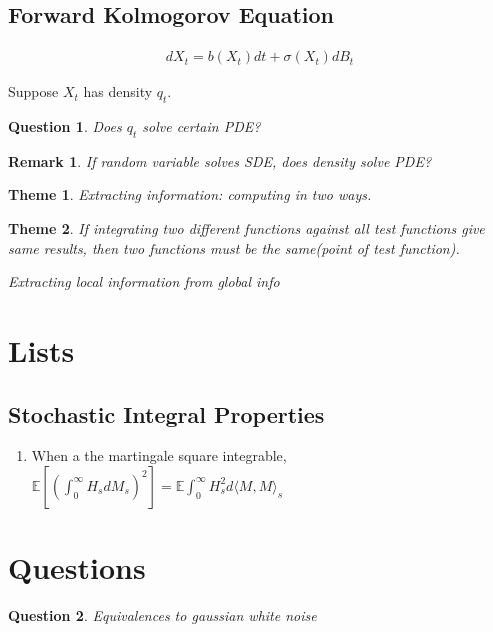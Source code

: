 \documentclass[11pt]{article}
\newcommand{\E}{\mathbb{E}}
\newtheorem{remark}{Remark}
\newtheorem{quest}{Question}
\newtheorem{theme}{Theme}
\begin{document}
\subsection{Forward Kolmogorov Equation}

\begin{align*}
	dX_t = b(X_t) dt + \sigma(X_t)dB_t
\end{align*}

Suppose $X_t$ has density $q_t$. 
\begin{quest}
	Does $q_t$ solve certain PDE?
\end{quest}

\begin{remark}
	If random variable solves SDE, does density solve PDE?
\end{remark}

\begin{theme}
	Extracting information: computing in two ways.
\end{theme}

\begin{theme}
	If integrating two different functions against all test functions give same results, then two functions must be the same(point of test function).

	 Extracting local information from global info
\end{theme}




\section{Lists}

\subsection{Stochastic Integral Properties}

\begin{enumerate}
	\item When a the martingale square integrable, $\E[(\int_0^{\infty} H_sdM_s)^2 ] = \E\int_0^{\infty} H_s^2d \langle M,M\rangle_s$
\end{enumerate}




\section{Questions}

\begin{quest}
	Equivalences to gaussian white noise
\end{quest}
\end{document}
